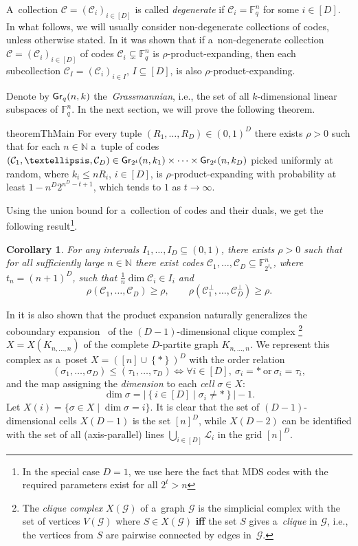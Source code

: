 \documentclass[conference]{IEEEtran}
\newcommand{\Iff}{\textbf{if\textcompwordmark f} }
\newcommand{\fbr}[1]{\left\{#1\right\}}
\let\le\leqslant
\let\ge\geqslant
\theoremstyle{plain}
\newtheorem{corollary}[theorem]{Corollary}
\theoremstyle{definition}
\theoremstyle{remark}
\newcommand{\NN}{\mathbb{N}}
\newcommand{\abs}[1]{\left\lvert #1 \right\rvert}
\newcommand{\cC}{\mathcal{C}}
\newcommand{\cG}{\mathcal{G}}
\newcommand{\cL}{\mathcal{L}}
\newcommand{\F}{\mathbb{F}}
\newcommand{\Gr}{{\sf Gr}}
\begin{document}
A~collection $\cC = (\cC_i)_{i\in [D]}$ is called \emph{degenerate} if $\cC_i=\F_q^{n}$ for some $i\in [D]$.  In what follows, we will usually consider non-degenerate collections of codes, unless otherwise stated.
In \cite[Lemma 11]{kalachevTwosidedRobustlyTestable2023} it was shown that if a~non-degenerate collection $\cC=(\cC_i)_{i\in [D]}$ of codes $\cC_i\subsetneq \F_q^{n}$ is $\rho$-product-expanding, then each subcollection $\cC_I=(\cC_i)_{i\in I}$, $I\subseteq [D]$, is also $\rho$-product-expanding.

Denote by $\Gr_q(n,k)$ the~\emph{Grassmannian}, i.e., the set of all $k$-dimensional linear subspaces of $\F_q^n$.
In the next section, we will prove the following theorem. 

\begin{restatable}{theorem}{ThMain}\label{th:rand-expanding}
     For every tuple $(R_1,\dots,R_D)\in (0,1)^D$ there exists $\rho>0$ such that for each $n\in \NN$ a~tuple of codes $(\cC_1,\dots,\cC_D) \in \Gr_{2^t}(n,k_1)\times \cdots\times\Gr_{2^t}(n,k_D)$ picked uniformly at random, where $k_i \le n R_i$, $i\in [D]$, is $\rho$-product-expanding with probability at least $1- n^D 2^{n^D - t + 1}$, which tends to $1$ as $t\to\infty$.
\end{restatable}
Using the union bound for a~collection of codes and their duals, we get the following result\footnote{In the special case $D=1$, we use here the fact that MDS codes with the required parameters exist for all $2^{t} > n$}.
\begin{corollary}
 For any intervals $I_1,\dots,I_D\subseteq (0,1)$, there exists $\rho>0$ such that for all sufficiently large ${n\in \NN}$ there exist codes $\cC_1,\dots,\cC_D\subseteq \F_{2^{t_n}}^n$, where ${t_n=(n+1)^D}$, such that $\frac{1}{n}\dim \cC_i\in I_i$ and  
 \[
 \rho(\cC_1,\dots,\cC_D)\ge\rho,\qquad \rho(\cC_1^\bot,\dots,\cC_D^\bot)\ge\rho.
 \]
\end{corollary}

In \cite[Appendix B]{kalachevTwosidedRobustlyTestable2023} it is also shown that the product expansion  naturally generalizes the coboundary expansion~\cite{Linial:2006,Gromov:2010} of the $(D-1)$-dimensional clique complex%
    \footnote{The \emph{clique complex} $X(\cG)$ of a~graph $\cG$ is the simplicial complex with the set of vertices $V(\cG)$ where $S\in  X(\cG)$ \Iff the set $S$ gives a~\emph{clique} in $\cG$, i.e., the vertices from $S$ are pairwise connected by edges in~$\cG$.} 
$X=X(K_{n,\dots,n})$ of the complete $D$-partite graph $K_{n,\dots,n}$. %
We represent this complex as a~poset 
$X = ([n]\cup\fbr{*})^D$ with the order relation
\[
(\sigma_1,\dots,\sigma_D) \!\le\!  (\tau_1,\dots,\tau_D)  \Leftrightarrow \forall i\in[D],\ \sigma_i = *\ \text{or}\ \sigma_i = \tau_i,
\]
and the map assigning the \emph{dimension} to each \emph{cell} $\sigma\in X$:
\[
\dim \sigma = \abs{\fbr{i\in[D]\mid \sigma_i\ne *}}-1.
\]
Let $X(i) = \{\sigma\in X \mid \dim \sigma = i\}$.
It is clear that the set of  $(D-1)$-dimensional cells $X(D-1)$ is the set $[n]^D$, while $X(D-2)$ can be  identified with the set of all (axis-parallel) lines $\bigcup_{i\in[D]}\cL_i$ in the grid $[n]^D$. 
\end{document}
